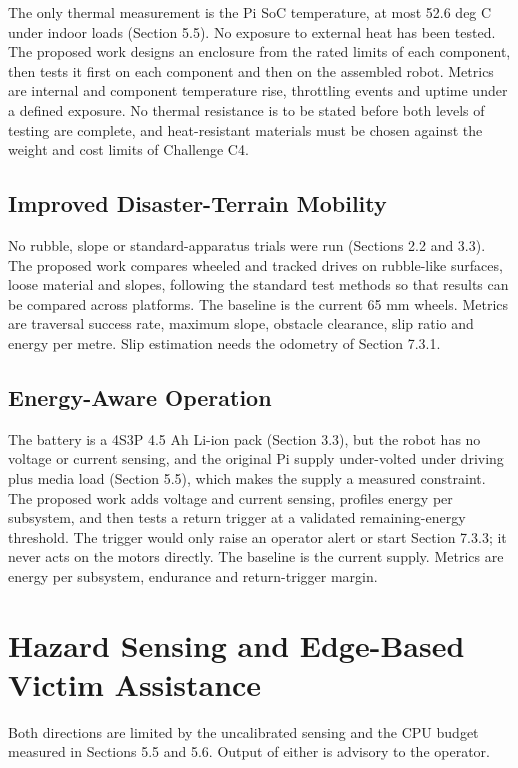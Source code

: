 The only thermal measurement is the Pi SoC temperature, at most 52.6 deg C under indoor loads (Section 5.5). No exposure to external heat has been tested. The proposed work designs an enclosure from the rated limits of each component, then tests it first on each component and then on the assembled robot. Metrics are internal and component temperature rise, throttling events and uptime under a defined exposure. No thermal resistance is to be stated before both levels of testing are complete, and heat-resistant materials must be chosen against the weight and cost limits of Challenge C4.

\subsection{Improved Disaster-Terrain Mobility}

No rubble, slope or standard-apparatus trials were run (Sections 2.2 and 3.3). The proposed work compares wheeled and tracked drives on rubble-like surfaces, loose material and slopes, following the standard test methods \cite{jacoff2012} so that results can be compared across platforms. The baseline is the current 65 mm wheels. Metrics are traversal success rate, maximum slope, obstacle clearance, slip ratio and energy per metre. Slip estimation needs the odometry of Section 7.3.1.

\subsection{Energy-Aware Operation}

The battery is a 4S3P 4.5 Ah Li-ion pack (Section 3.3), but the robot has no voltage or current sensing, and the original Pi supply under-volted under driving plus media load (Section 5.5), which makes the supply a measured constraint. The proposed work adds voltage and current sensing, profiles energy per subsystem, and then tests a return trigger at a validated remaining-energy threshold. The trigger would only raise an operator alert or start Section 7.3.3; it never acts on the motors directly. The baseline is the current supply. Metrics are energy per subsystem, endurance and return-trigger margin.

\section{Hazard Sensing and Edge-Based Victim Assistance}

Both directions are limited by the uncalibrated sensing and the CPU budget measured in Sections 5.5 and 5.6. Output of either is advisory to the operator.

